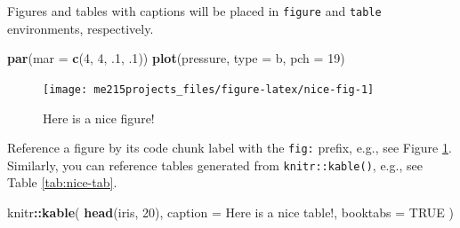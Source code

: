 \documentclass[
]{book}
\newenvironment{Shaded}{\begin{snugshade}}{\end{snugshade}}
\newcommand{\DataTypeTok}[1]{\textcolor[rgb]{0.13,0.29,0.53}{#1}}
\newcommand{\DecValTok}[1]{\textcolor[rgb]{0.00,0.00,0.81}{#1}}
\newcommand{\FloatTok}[1]{\textcolor[rgb]{0.00,0.00,0.81}{#1}}
\newcommand{\KeywordTok}[1]{\textcolor[rgb]{0.13,0.29,0.53}{\textbf{#1}}}
\newcommand{\NormalTok}[1]{#1}
\newcommand{\OperatorTok}[1]{\textcolor[rgb]{0.81,0.36,0.00}{\textbf{#1}}}
\newcommand{\OtherTok}[1]{\textcolor[rgb]{0.56,0.35,0.01}{#1}}
\newcommand{\StringTok}[1]{\textcolor[rgb]{0.31,0.60,0.02}{#1}}
\begin{document}
Figures and tables with captions will be placed in \texttt{figure} and \texttt{table} environments, respectively.

\begin{Shaded}
\begin{Highlighting}[]
\KeywordTok{par}\NormalTok{(}\DataTypeTok{mar =} \KeywordTok{c}\NormalTok{(}\DecValTok{4}\NormalTok{, }\DecValTok{4}\NormalTok{, }\FloatTok{.1}\NormalTok{, }\FloatTok{.1}\NormalTok{))}
\KeywordTok{plot}\NormalTok{(pressure, }\DataTypeTok{type =} \StringTok{\textquotesingle{}b\textquotesingle{}}\NormalTok{, }\DataTypeTok{pch =} \DecValTok{19}\NormalTok{)}
\end{Highlighting}
\end{Shaded}

\begin{figure}

{\centering \texttt{[image: me215projects\_files/figure-latex/nice-fig-1]} 

}

\caption{Here is a nice figure!}\label{fig:nice-fig}
\end{figure}

Reference a figure by its code chunk label with the \texttt{fig:} prefix, e.g., see Figure \ref{fig:nice-fig}. Similarly, you can reference tables generated from \texttt{knitr::kable()}, e.g., see Table \ref{tab:nice-tab}.

\begin{Shaded}
\begin{Highlighting}[]
\NormalTok{knitr}\OperatorTok{::}\KeywordTok{kable}\NormalTok{(}
  \KeywordTok{head}\NormalTok{(iris, }\DecValTok{20}\NormalTok{), }\DataTypeTok{caption =} \StringTok{\textquotesingle{}Here is a nice table!\textquotesingle{}}\NormalTok{,}
  \DataTypeTok{booktabs =} \OtherTok{TRUE}
\NormalTok{)}
\end{Highlighting}
\end{Shaded}
\end{document}
